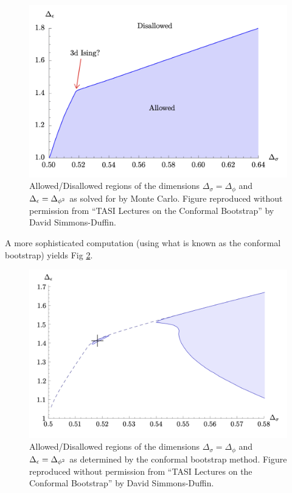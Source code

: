 \begin{figure}[htbp]
    \centering
    \includegraphics[scale=0.4]{Images/fig-montecarloplot.png}
    \caption{Allowed/Disallowed regions of the dimensions $\Delta_\sigma = \Delta_\phi$ and $\Delta_\e = \Delta_{\phi^2}$ as solved for by Monte Carlo. Figure reproduced without permission from ``TASI Lectures on the Conformal Bootstrap'' by David Simmons-Duffin.}
    \label{fig-montecarloplot}
\end{figure}

A more sophisticated computation (using what is known as the conformal bootstrap) yields Fig \ref{fig-CFTbootstrapplot}.

\begin{figure}[htbp]
    \centering
    \includegraphics[scale=0.4]{Images/fig-CFTbootstrapplot.png}
    \caption{Allowed/Disallowed regions of the dimensions $\Delta_\sigma = \Delta_\phi$ and $\Delta_\e = \Delta_{\phi^2}$ as determined by the conformal bootstrap method. Figure reproduced without permission from ``TASI Lectures on the Conformal Bootstrap'' by David Simmons-Duffin.}
    \label{fig-CFTbootstrapplot}
\end{figure}

